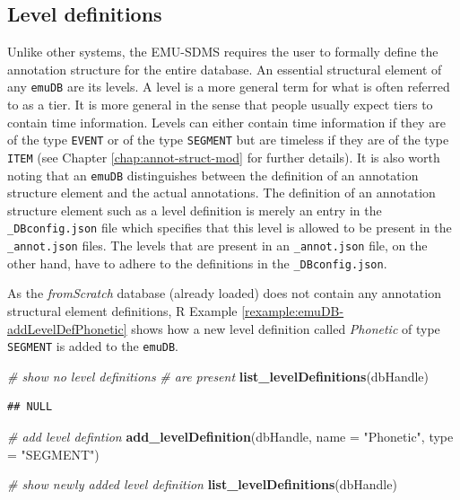\documentclass[]{book}
\newenvironment{Shaded}{\begin{snugshade}}{\end{snugshade}}
\newcommand{\CommentTok}[1]{\textcolor[rgb]{0.56,0.35,0.01}{\textit{#1}}}
\newcommand{\DataTypeTok}[1]{\textcolor[rgb]{0.13,0.29,0.53}{#1}}
\newcommand{\KeywordTok}[1]{\textcolor[rgb]{0.13,0.29,0.53}{\textbf{#1}}}
\newcommand{\NormalTok}[1]{#1}
\newcommand{\StringTok}[1]{\textcolor[rgb]{0.31,0.60,0.02}{#1}}
\theoremstyle{definition}
\theoremstyle{definition}
\theoremstyle{definition}
\theoremstyle{remark}
\begin{document}
\hypertarget{level-definitions}{%
\subsection{Level definitions}\label{level-definitions}}

Unlike other systems, the EMU-SDMS requires the user to formally define
the annotation structure for the entire database. An essential
structural element of any \texttt{emuDB} are its levels. A level is a
more general term for what is often referred to as a tier. It is more
general in the sense that people usually expect tiers to contain time
information. Levels can either contain time information if they are of
the type \texttt{EVENT} or of the type \texttt{SEGMENT} but are timeless
if they are of the type \texttt{ITEM} (see Chapter
\ref{chap:annot-struct-mod} for further details). It is also worth
noting that an \texttt{emuDB} distinguishes between the definition of an
annotation structure element and the actual annotations. The definition
of an annotation structure element such as a level definition is merely
an entry in the \texttt{\_DBconfig.json} file which specifies that this
level is allowed to be present in the \texttt{\_annot.json} files. The
levels that are present in an \texttt{\_annot.json} file, on the other
hand, have to adhere to the definitions in the \texttt{\_DBconfig.json}.

As the \emph{fromScratch} database (already loaded) does not contain any
annotation structural element definitions, R Example
\ref{rexample:emuDB-addLevelDefPhonetic} shows how a new level
definition called \emph{Phonetic} of type \texttt{SEGMENT} is added to
the \texttt{emuDB}.

\begin{Shaded}
\begin{Highlighting}[]
\CommentTok{# show no level definitions}
\CommentTok{# are present}
\KeywordTok{list_levelDefinitions}\NormalTok{(dbHandle)}
\end{Highlighting}
\end{Shaded}

\begin{verbatim}
## NULL
\end{verbatim}

\begin{Shaded}
\begin{Highlighting}[]
\CommentTok{# add level defintion}
\KeywordTok{add_levelDefinition}\NormalTok{(dbHandle,}
                    \DataTypeTok{name =} \StringTok{"Phonetic"}\NormalTok{,}
                    \DataTypeTok{type =} \StringTok{"SEGMENT"}\NormalTok{)}

\CommentTok{# show newly added level definition}
\KeywordTok{list_levelDefinitions}\NormalTok{(dbHandle)}
\end{Highlighting}
\end{Shaded}
\end{document}
